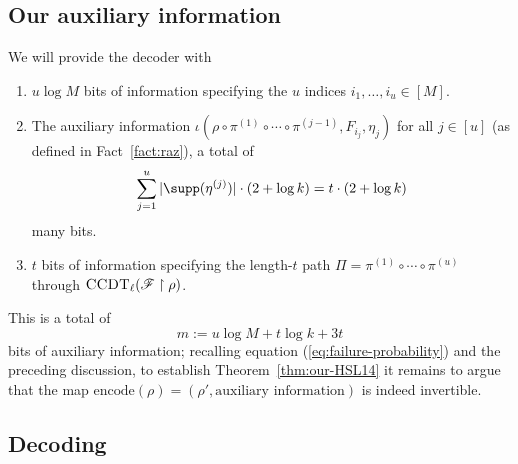 \documentclass[11pt]{article}
\numberwithin{equation}{section}
\theoremstyle{definition}
\theoremstyle{plain}
\theoremstyle{plain}
\newcommand{\uhr}{\upharpoonright}
\newcommand{\encode}{\mathrm{encode}}
\newcommand{\CCDT}{\textsc{CCDT}}
\begin{document}
\subsection{Our auxiliary information}  
\label{sec:aux}
We will provide the decoder with 
\begin{enumerate}
\item $u \log M$ bits of information specifying the $u$ indices $i_1,\ldots,i_u \in [M]$.
\item  The auxiliary information $\iota(\rho \circ \pi^{(1)}\circ\cdots \circ\pi^{(j-1)}, F_{i_j},\eta_j)$ for all $j\in [u]$ (as defined in Fact~\ref{fact:raz}), a total of 
\[ \sum_{j=1}^u |\supp(\eta^{(j)})| \cdot (2+ \log k) = t \cdot (2 + \log k) \] 
many bits.
\item $t$ bits of information specifying the length-$t$ path $\Pi = \pi^{(1)} \circ \cdots \circ \pi^{(u)}$ through $\CCDT_\ell(\mathscr{F} \uhr \rho)$. 
\end{enumerate} 
This is a total of 
\[ m := u\log M + t\log k + 3t \] 
bits of auxiliary information; recalling equation (\ref{eq:failure-probability}) and the preceding discussion, to establish Theorem~\ref{thm:our-HSL14} it remains to argue that the map $\encode(\rho) = (\rho',\text{auxiliary information})$ is indeed invertible. 

\subsection{Decoding} 
\end{document}
